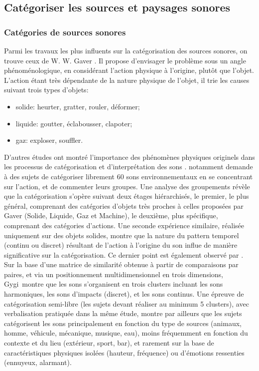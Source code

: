 \subsection{Catégoriser les sources et paysages sonores}
\label{sec:ch3_catSourceSoundScape}

\subsubsection{Catégories de sources sonores}
\label{sec:ch3_catSource}

Parmi les travaux les plus influents sur la catégorisation des sources sonores, on trouve ceux de W. W. Gaver \citep{gaver1993world,gaver1993we}. Il propose d'envisager le problème sous un angle phénoménologique, en considérant l'action physique à l'origine, plutôt que l'objet. L'action étant très dépendante de la nature physique de l'objet, il trie les causes suivant trois types d'objets:

\begin{itemize}
\item solide: heurter, gratter, rouler, déformer;
\item liquide: goutter, éclabousser, clapoter;
\item gaz: exploser, souffler.
\end{itemize} 

D'autres études ont montré l'importance des phénomènes physiques originels dans les processus de catégorisation et d'interprétation des sons \citep{marcell2000confrontation,lemaitre2010listener}. \citep{houix_lexical_2012} notamment demande à des sujets de catégoriser librement 60 sons environnementaux en se concentrant sur l'action, et de commenter leurs groupes. Une analyse des groupements révèle que la catégorisation s'opère suivant deux étages hiérarchisés, le premier, le plus général, comprenant des catégories d'objets très proches à celles proposées par Gaver (Solide, Liquide, Gaz et Machine), le deuxième, plus spécifique, comprenant des catégories d'actions. Une seconde expérience similaire, réalisée uniquement sur des objets solides, montre que la nature du pattern temporel (continu ou discret) résultant de l'action à l'origine du son influe de manière significative sur la catégorisation. Ce dernier point est également observé par \citep{gygi2007similarity}. Sur la base d'une matrice de similarité obtenue à partir de comparaisons par paires, et via un positionnement multidimensionnel en trois dimensions, Gygi~\al montre que les sons s'organisent en trois clusters incluant les sons harmoniques, les sons d'impacts (discret), et les sons continus. Une épreuve de catégorisation semi-libre (les sujets devant réaliser au minimum 5 clusters), avec verbalisation pratiquée dans la même étude, montre par ailleurs que les sujets catégorisent les sons principalement en fonction du type de sources (animaux, homme, véhicule, mécanique, musique, eau), moins fréquemment en fonction du contexte et du lieu (extérieur, sport, bar), et rarement sur la base de caractéristiques physiques isolées (hauteur, fréquence) ou d'émotions ressenties (ennuyeux, alarmant).

